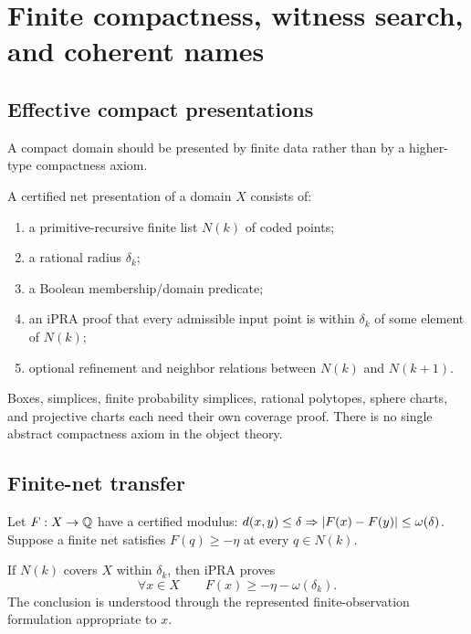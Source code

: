 \section{Finite compactness, witness search, and coherent names}
\label{sec:compactness}

\subsection{Effective compact presentations}

A compact domain should be presented by finite data rather than by a higher-type compactness axiom.

\begin{definition}
A certified net presentation of a domain $X$ consists of:
\begin{enumerate}[label=(\alph*)]
\item a primitive-recursive finite list $N(k)$ of coded points;
\item a rational radius $\delta_k$;
\item a Boolean membership/domain predicate;
\item an iPRA proof that every admissible input point is within $\delta_k$ of some element of $N(k)$;
\item optional refinement and neighbor relations between $N(k)$ and $N(k+1)$.
\end{enumerate}
\end{definition}
Boxes, simplices, finite probability simplices, rational polytopes, sphere charts, and projective charts each need their own coverage proof.  There is no single abstract compactness axiom in the object theory.

\subsection{Finite-net transfer}

Let $F:X\to\mathbb Q$ have a certified modulus: $d(x,y)\le\delta\Rightarrow\lvert F(x)-F(y)\rvert\le\omega(\delta)$.  Suppose a finite net satisfies $F(q)\ge -\eta$ at every $q\in N(k)$.

\begin{theorem}
\label{thm:finite-net}
If $N(k)$ covers $X$ within $\delta_k$, then iPRA proves
\[
  \forall x\in X\qquad F(x)\ge-\eta-\omega(\delta_k).
\]
The conclusion is understood through the represented finite-observation formulation appropriate to $x$.
\end{theorem}

